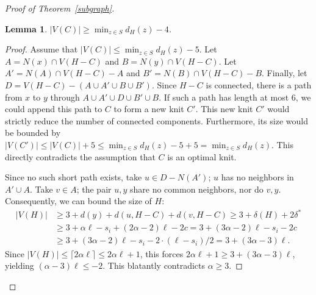 \documentclass[11pt]{amsart}
\newtheorem{lemma}{Lemma}
\begin{document}
\begin{proof}[Proof of Theorem~\ref{subgraph}]
\begin{lemma}
$|V(C)| \ge \min_{z\in S} d_H(z)-4$. %
\end{lemma}

\begin{proof}
Assume that $|V(C)| \le \min_{z\in S} d_H(z)-5$. 
Let $A=N(x)\cap V(H-C)$ and $B=N(y)\cap V(H-C)$. Let $A'=N(A)\cap V(H-C)-A$ and $B'=N(B)\cap V(H-C)-B$. Finally, let $D=V(H-C)-(A\cup A'\cup B\cup B')$. Since $H-C$ is connected, there is a path from $x$ to $y$ through $A\cup A'\cup D\cup B'\cup B$. If such a path has length at most $6$, we could append this path to $C$ to form a new knit $C'$. This new knit $C'$ would strictly reduce the number of connected components. Furthermore, its size would be bounded by $|V(C')| \le |V(C)| + 5 \le \min_{z\in S} d_H(z)-5+5=\min_{z\in S} d_H(z)$. This directly contradicts the assumption that $C$ is an optimal knit.

Since no such short path exists, take $u\in D-N(A')$; $u$ has no neighbors in $A'\cup A$. Take $v\in A$; the pair $u, y$ share no common neighbors, nor do $v, y$. 
Consequently, we can bound the size of $H$:
\begin{align*} 
|V(H)| &\ge 3+d(y) + d(u, H-C) + d(v, H-C) \ge 3+\delta(H) + 2\delta^* \\
&\ge 3+\alpha\ell-s_i + (2\alpha - 2)\ell -2c= 3+(3\alpha - 2)\ell-s_i-2c\\
&\ge 3+(3\alpha - 2)\ell-s_i-2\cdot (\ell-s_i)/2=3+(3\alpha-3)\ell.
\end{align*}
Since $|V(H)|\le \lceil 2\alpha\ell\rceil\le 2\alpha\ell + 1$, this forces $2\alpha\ell + 1 \ge 3+(3\alpha-3)\ell$, yielding $(\alpha-3)\ell\le -2$. This blatantly contradicts $\alpha \ge 3$. 
\end{proof}


\end{proof}
\end{document}
